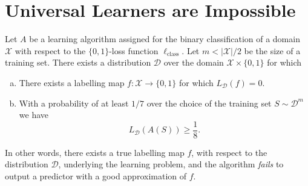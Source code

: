 \section{Universal Learners are Impossible}

\begin{theorem}
\label{thm:no-free-lunch}
Let \(A\) be a learning algorithm assigned for the binary classification of a
domain \(\mathcal{X}\) with respect to the \(\{0, 1\}\)-loss function
\(\ell_{\text{class}}\). Let \(m < |\mathcal{X}|/2\) be the size of a training
set. There exists a distribution \(\mathcal{D}\) over the domain
\(\mathcal{X} \times \{0, 1\}\) for which
\begin{enumerate}[(a)]\setlength\itemsep{0em}
\item There exists a labelling map \(f: \mathcal{X} \to \{0, 1\}\) for which
  \(L_{\mathcal{D}}(f) = 0\).
\item With a probability of at least \(1/7\) over the choice of the training set
  \(S \sim \mathcal{D}^m\) we have
  \[
  L_{\mathcal{D}}(A(S)) \geq \frac{1}{8}.
  \]
\end{enumerate}
In other words, there exists a true labelling map \(f\), with respect to the
distribution \(\mathcal{D}\), underlying the learning problem, and the algorithm
\emph{fails} to output a predictor with a good approximation of \(f\).
\end{theorem}

